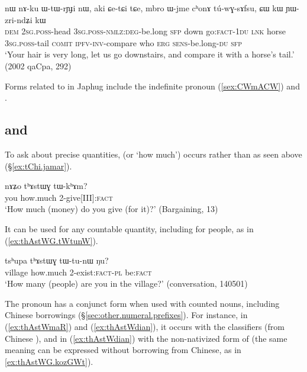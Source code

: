 \begin{exe}
\ex  \label{ex:CW.kW.YWzrindZi}
\gll nɯ nɤ-ku ɯ-tɯ-rɲɟi nɯ, aki ɕe-tɕi tɕe, mbro ɯ-jme cʰonɤ tú-wɣ-sɤfsu, ɕɯ kɯ ɲɯ-zri-ndʑi kɯ \\
\textsc{dem} \textsc{2sg}.\textsc{poss}-head \textsc{3sg}.\textsc{poss}-\textsc{nmlz}:\textsc{deg}-be.long  \textsc{sfp} down go:\textsc{fact}-\textsc{1du} \textsc{lnk} horse \textsc{3sg}.\textsc{poss}-tail \textsc{comit}  \textsc{ipfv}-\textsc{inv}-compare who \textsc{erg} \textsc{sens}-be.long-\textsc{du} \textsc{sfp} \\
\glt `Your hair is very long, let us go downstairs, and compare it with a horse's tail.' (2002 qaCpa, 292)
\end{exe}  

Forms related to  in Japhug include the indefinite pronoun  (\ref{sex:CWmACW}) and .

\subsection{ and } \label{sec:thAstWG}
To ask about precise quantities,  (or `how much') occurs rather than  as seen above (§\ref{ex:tChi.jamar}).

\begin{exe}
\ex \label{ex:thAstWG.tWkhAm}
 \gll    nɤʑo 	tʰɤstɯɣ 	tɯ-kʰɤm?    \\
 you how.much 2-give[III]:\textsc{fact}  \\
\glt  `How much (money) do you give (for it)?' (Bargaining, 13)
\end{exe} 

It can be used for any countable quantity, including for people, as in (\ref{ex:thAstWG.tWtunW}).

\begin{exe}
\ex \label{ex:thAstWG.tWtunW}
 \gll tsʰupa tʰɤstɯɣ tɯ-tu-nɯ ŋu? \\
village how.much 2-exist:\textsc{fact}-\textsc{pl} be:\textsc{fact} \\
\glt `How many (people) are you in the village?' (conversation, 140501)
\end{exe} 

The pronoun  has a conjunct form  when used with counted nouns, including Chinese borrowings (§\ref{sec:other.numeral.prefixes}). For instance, in (\ref{ex:thAstWmaR}) and (\ref{ex:thAstWdian}), it occurs with the classifiers  (from Chinese  ), and in (\ref{ex:thAstWdian}) with the non-nativized form of  (the same meaning can be expressed without borrowing from Chinese, as in \ref{ex:thAstWG.kozGWt}).

